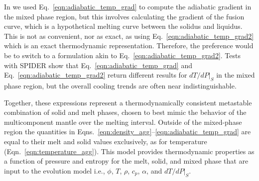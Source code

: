 In \cite{BSW18,BKW19} we used Eq.~\ref{eqn:adiabatic_temp_grad} to compute the adiabatic gradient in the mixed phase region, but this involves calculating the gradient of the fusion curve, which is a hypothetical melting curve between the solidus and liquidus.  This is not as convenient, nor as exact, as using Eq.~\ref{eqn:adiabatic_temp_grad2} which is an exact thermodynamic representation.  Therefore, the preference would be to switch to a formulation akin to Eq.~\ref{eqn:adiabatic_temp_grad2}.  Tests with SPIDER show that  Eq.~\ref{eqn:adiabatic_temp_grad} and  Eq.~\ref{eqn:adiabatic_temp_grad2} return different results for $dT/dP|_S$ in the mixed phase region, but the overall cooling trends are often near indistinguishable.

Together, these expressions represent a thermodynamically consistent metastable combination of solid and melt phases, chosen to best mimic the behavior of the multicomponent mantle over the melting interval.  Outside of the mixed-phase region the quantities in Eqns.~\ref{eqn:density_agg}--\ref{eqn:adiabatic_temp_grad} are equal to their melt and solid values exclusively, as for temperature (Eqn.~\ref{eqn:temperature_agg}).  This model provides thermodynamic properties as a function of pressure and entropy for the melt, solid, and mixed phase that are input to the evolution model i.e., $\phi$, $T$, $\rho$, $c_p$, $\alpha$, and $dT/dP|_S$.
